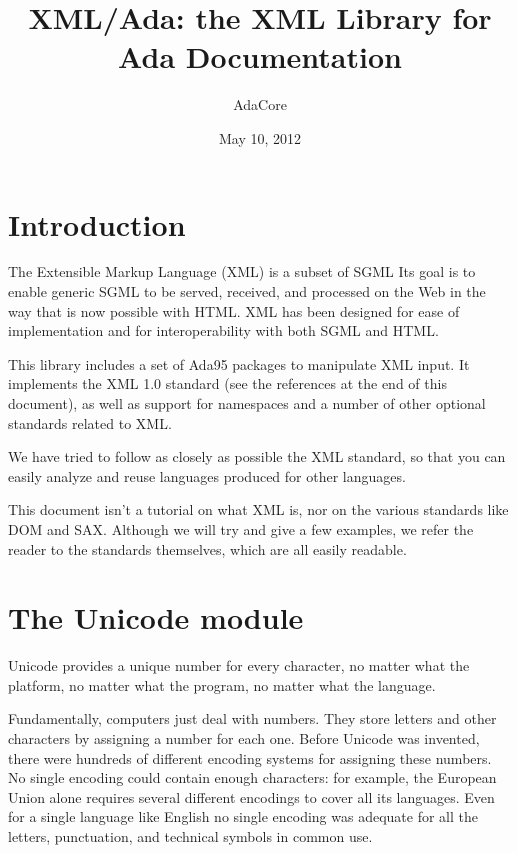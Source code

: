 \documentclass[letterpaper,10pt,english]{sphinxmanual}
\title{XML/Ada: the XML Library for Ada Documentation}
\date{May 10, 2012}
\author{AdaCore}
\begin{document}
\maketitle
\tableofcontents
{}\label{index::doc}



\chapter{Introduction}
\label{intro:introduction}\label{intro::doc}\label{intro:xml-ada-the-unicode-and-xml-library-for-ada}
The Extensible Markup Language (XML) is a subset of SGML Its goal is to enable
generic SGML to be served, received, and processed on the Web in the way that
is now possible with HTML. XML has been designed for ease of implementation and
for interoperability with both SGML and HTML.

This library includes a set of Ada95 packages to manipulate XML input. It
implements the XML 1.0 standard (see the references at the end of this
document), as well as support for namespaces and a number of other optional
standards related to XML.

We have tried to follow as closely as possible the XML standard, so that you
can easily analyze and reuse languages produced for other languages.

This document isn't a tutorial on what XML is, nor on the various standards
like DOM and SAX. Although we will try and give a few examples, we refer the
reader to the standards themselves, which are all easily readable.


\chapter{The Unicode module}
\label{unicode:the-unicode-module}\label{unicode::doc}\label{unicode:id1}
Unicode provides a unique number for every character, no matter what the
platform, no matter what the program, no matter what the language.

Fundamentally, computers just deal with numbers. They store letters and other
characters by assigning a number for each one. Before Unicode was invented,
there were hundreds of different encoding systems for assigning these numbers.
No single encoding could contain enough characters: for example, the European
Union alone requires several different encodings to cover all its languages.
Even for a single language like English no single encoding was adequate for all
the letters, punctuation, and technical symbols in common use.
\end{document}
